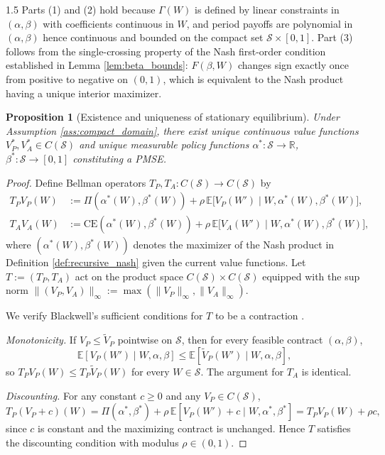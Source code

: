 \documentclass[12pt]{article}
\newtheorem{proposition}{Proposition}[section]
\theoremstyle{definition}
\theoremstyle{plain}
\begin{document}
\begin{spacing}{1.5}
Parts (1) and (2) hold because $\Gamma(W)$ is defined by linear constraints in $(\alpha,\beta)$ with coefficients continuous in $W$, and period payoffs are polynomial in $(\alpha,\beta)$ hence continuous and bounded on the compact set $\mathcal{S} \times [0,1]$. Part (3) follows from the single-crossing property of the Nash first-order condition established in Lemma \ref{lem:beta_bounds}: $F(\beta, W)$ changes sign exactly once from positive to negative on $(0,1)$, which is equivalent to the Nash product having a unique interior maximizer.

\begin{proposition}[Existence and uniqueness of stationary equilibrium]\label{prop:existence}
Under Assumption \ref{ass:compact_domain}, there exist unique continuous value functions $V_P^*, V_A^* \in C(\mathcal{S})$ and unique measurable policy functions $\alpha^* : \mathcal{S} \to \mathbb{R}$, $\beta^* : \mathcal{S} \to [0,1]$ constituting a PMSE.
\end{proposition}

\begin{proof}
Define Bellman operators $T_P, T_A : C(\mathcal{S}) \to C(\mathcal{S})$ by
\begin{align}
T_P V_P(W) &:= \Pi(\alpha^*(W),\beta^*(W)) + \rho\,\mathbb{E}\bigl[V_P(W') \mid W, \alpha^*(W), \beta^*(W)\bigr], \label{eq:proof_TP} \\
T_A V_A(W) &:= \mathrm{CE}(\alpha^*(W),\beta^*(W)) + \rho\,\mathbb{E}\bigl[V_A(W') \mid W, \alpha^*(W), \beta^*(W)\bigr], \label{eq:proof_TA}
\end{align}
where $(\alpha^*(W),\beta^*(W))$ denotes the maximizer of the Nash product in Definition \ref{def:recursive_nash} given the current value functions. Let $T := (T_P, T_A)$ act on the product space $C(\mathcal{S}) \times C(\mathcal{S})$ equipped with the sup norm $\|(V_P, V_A)\|_\infty := \max(\|V_P\|_\infty, \|V_A\|_\infty)$.

We verify Blackwell's sufficient conditions for $T$ to be a contraction \parencite[Theorem 3.3]{stokey1989}.

\textit{Monotonicity.} If $V_P \leq \tilde{V}_P$ pointwise on $\mathcal{S}$, then for every feasible contract $(\alpha,\beta)$,
\[
\mathbb{E}[V_P(W') \mid W, \alpha, \beta] \leq \mathbb{E}[\tilde{V}_P(W') \mid W, \alpha, \beta],
\]
so $T_P V_P(W) \leq T_P \tilde{V}_P(W)$ for every $W \in \mathcal{S}$. The argument for $T_A$ is identical.

\textit{Discounting.} For any constant $c \geq 0$ and any $V_P \in C(\mathcal{S})$,
\[
T_P(V_P + c)(W) = \Pi(\alpha^*,\beta^*) + \rho\,\mathbb{E}[V_P(W') + c \mid W, \alpha^*,\beta^*] = T_P V_P(W) + \rho c,
\]
since $c$ is constant and the maximizing contract is unchanged. Hence $T$ satisfies the discounting condition with modulus $\rho \in (0,1)$.


\end{proof}
\end{spacing}
\end{document}
